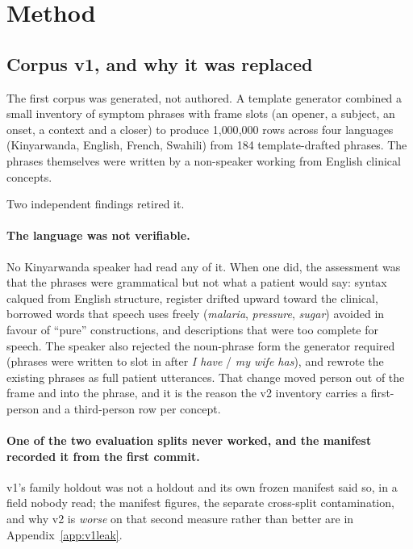 %
%

\section{Method}
\label{sec:method}

\subsection{Corpus v1, and why it was replaced}

The first corpus was generated, not authored. A template generator combined a
small inventory of symptom phrases with frame slots (an opener, a subject, an
onset, a context and a closer) to produce 1{,}000{,}000 rows across four
languages (Kinyarwanda, English, French, Swahili) from 184 template-drafted
phrases. The phrases themselves were written by a non-speaker working from
English clinical concepts.

Two independent findings retired it.

\paragraph{The language was not verifiable.} No Kinyarwanda speaker had read any
of it. When one did, the assessment was that the phrases were grammatical but
not what a patient would say: syntax calqued from English structure, register
drifted upward toward the clinical, borrowed words that speech uses freely
(\emph{malaria}, \emph{pressure}, \emph{sugar}) avoided in favour of ``pure''
constructions, and descriptions that were too complete for speech. The speaker
also rejected the noun-phrase form the generator required (phrases were
written to slot in after \emph{I have} / \emph{my wife has}), and rewrote the
existing phrases as full patient utterances. That change moved person out of the
frame and into the phrase, and it is the reason the v2 inventory carries a
first-person and a third-person row per concept.

\paragraph{One of the two evaluation splits never worked, and the manifest
recorded it from the first commit.} v1's family holdout was not a holdout and its
own frozen manifest said so, in a field nobody read; the manifest figures, the
separate cross-split contamination, and why v2 is \emph{worse} on that second
measure rather than better are in Appendix~\ref{app:v1leak}.

